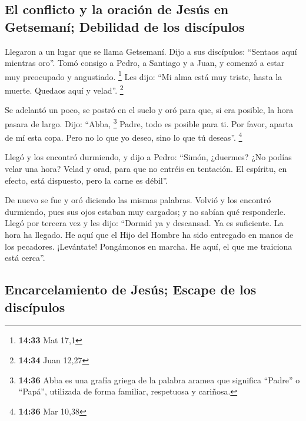 \begin{paracol}{2}
\hypertarget{el-conflicto-y-la-oraciuxf3n-de-jesuxfas-en-getsemanuxed-debilidad-de-los-discuxedpulos}{%
\subsection{El conflicto y la oración de Jesús en Getsemaní; Debilidad
de los
discípulos}\label{el-conflicto-y-la-oraciuxf3n-de-jesuxfas-en-getsemanuxed-debilidad-de-los-discuxedpulos}}

 Llegaron a un lugar que se llama Getsemaní. Dijo a sus
discípulos: ``Sentaos aquí mientras oro''.  Tomó consigo
a Pedro, a Santiago y a Juan, y comenzó a estar muy preocupado y
angustiado. \footnote{\textbf{14:33} Mat 17,1}  Les dijo:
``Mi alma está muy triste, hasta la muerte. Quedaos aquí y velad''.
\footnote{\textbf{14:34} Juan 12,27}

 Se adelantó un poco, se postró en el suelo y oró para
que, si era posible, la hora pasara de largo.  Dijo:
``Abba, \footnote{\textbf{14:36} Abba es una grafía griega de la palabra
  aramea que significa ``Padre'' o ``Papá'', utilizada de forma
  familiar, respetuosa y cariñosa.} Padre, todo es posible para ti. Por
favor, aparta de mí esta copa. Pero no lo que yo deseo, sino lo que tú
deseas''. \footnote{\textbf{14:36} Mar 10,38}

 Llegó y los encontró durmiendo, y dijo a Pedro: ``Simón,
¿duermes? ¿No podías velar una hora?  Velad y orad, para
que no entréis en tentación. El espíritu, en efecto, está dispuesto,
pero la carne es débil''.

 De nuevo se fue y oró diciendo las mismas palabras.
 Volvió y los encontró durmiendo, pues sus ojos estaban
muy cargados; y no sabían qué responderle.  Llegó por
tercera vez y les dijo: ``Dormid ya y descansad. Ya es suficiente. La
hora ha llegado. He aquí que el Hijo del Hombre ha sido entregado en
manos de los pecadores.  ¡Levántate! Pongámonos en
marcha. He aquí, el que me traiciona está cerca''.

\hypertarget{encarcelamiento-de-jesuxfas-escape-de-los-discuxedpulos}{%
\subsection{Encarcelamiento de Jesús; Escape de los
discípulos}\label{encarcelamiento-de-jesuxfas-escape-de-los-discuxedpulos}}


\end{paracol}
